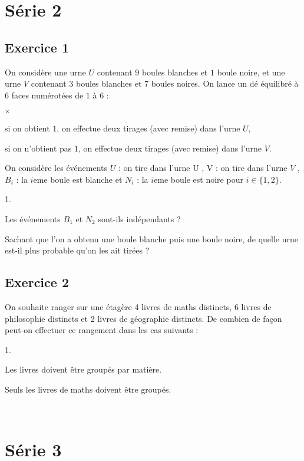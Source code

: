\documentclass[11pt]{article}%
\begin{document}
\section{Série 2}

\subsection*{Exercice 1}
\noindent
On considère une urne $U$ contenant $9$ boules blanches et $1$ boule
  noire, et une urne $V$ contenant $3$ boules blanches et $7$ boules
  noires. On lance un dé équilibré à $6$ faces numérotées de $1$ à
  $6$ :
  \begin{noliste}{$\scriptstyle \times$}
  \item si on obtient $1$, on effectue deux tirages (avec 
  remise) dans l'urne $U$,
  \item si on n'obtient pas $1$, on effectue deux tirages 
  (avec remise) dans l'urne $V$.
  \end{noliste}
  On considère les événements $U$ : \og on tire dans l'urne U \fg{}, V
  : \og on tire dans l'urne $V$ \fg{}, $B_i$ : \og la $i$eme boule
  est blanche \fg{} et $N_i$ : \og la $i$eme boule est noire \fg{}
  pour $i \in \{1,2\}$.
  \begin{noliste}{1.}
  \item Les événements $B_1$ et $N_2$ sont-ils indépendants ?
  \item Sachant que l'on a obtenu une boule blanche puis une boule
    noire, de quelle urne est-il plus probable qu'on les ait tirées ?
  \end{noliste}
  
  
\subsection*{Exercice 2}
\noindent
On souhaite ranger sur une étagère 4 livres de maths distincts, 6 
livres de philosophie distincts et 2 livres de géographie distincts. De 
combien de façon peut-on effectuer ce rangement dans les cas suivants :
\begin{noliste}{1.}
 \item Les livres doivent être groupés par matière.
 \item Seuls les livres de maths doivent être groupés.
\end{noliste}~\\[-1.4cm]

     
\newpage
      

\section{Série 3}
\end{document}
